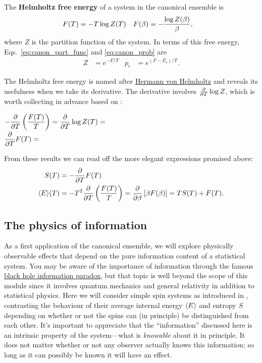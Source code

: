 \begin{shaded}
  The \textbf{Helmholtz free energy} of a system in the canonical ensemble is
  \begin{align}
    \label{eq:helmholtz}
    F(T) & = -T \log Z(T) &
    F(\beta) & = -\frac{\log Z(\beta)}{\beta},
  \end{align}
  where $Z$ is the partition function of the system.
  In terms of this free energy, Eqs.~\ref{eq:canon_part_func} and \ref{eq:canon_prob} are
  \begin{align*}
    Z & = e^{-F / T} &
    p_i & = e^{(F - E_i) / T}.
  \end{align*}
\end{shaded}

\newpage %
The Helmholtz free energy is named after \href{https://en.wikipedia.org/wiki/Hermann_von_Helmholtz}{Hermann von Helmholtz} and reveals its usefulness when we take its derivative.
The derivative involves $\frac{\partial }{\partial T} \log Z$, which is worth collecting in advance based on :
\begin{mdframed}
  $\displaystyle -\frac{\partial }{\partial T}\left(\frac{F(T)}{T}\right) = \frac{\partial }{\partial T} \log Z(T) = $ \\[50 pt]
  $\displaystyle \frac{\partial }{\partial T} F(T) = $ \\[50 pt]
\end{mdframed}
From these results we can read off the more elegant expressions promised above:
\begin{align}
  S(T) & = -\frac{\partial }{\partial T} F(T) \label{eq:canon_entropy-F} \\
  \left\langle E \right\rangle\!(T) & = -T^2 \frac{\partial }{\partial T}\left(\frac{F(T)}{T}\right) = \frac{\partial }{\partial \beta}\left[\beta F(\beta)\right] = T S(T) + F(T). \label{eq:canon_energy-F}
\end{align}



\subsection{\label{sec:spin_info}The physics of information}
As a first application of the canonical ensemble, we will explore physically observable effects that depend on the pure information content of a statistical system.
You may be aware of the importance of information through the famous \href{https://en.wikipedia.org/wiki/Black_hole_information_paradox}{black hole information paradox}, but that topic is well beyond the scope of this module since it involves quantum mechanics and general relativity in addition to statistical physics.
Here we will consider simple spin systems as introduced in , contrasting the behaviour of their average internal energy $\left\langle E \right\rangle$ and entropy $S$ depending on whether or not the spins can (in principle) be distinguished from each other.
It's important to appreciate that the ``information'' discussed here is an intrinsic property of the system---what is \textit{knowable} about it in principle.
It does not matter whether or not any observer actually knows this information; so long as it can possibly be known it will have an effect.

